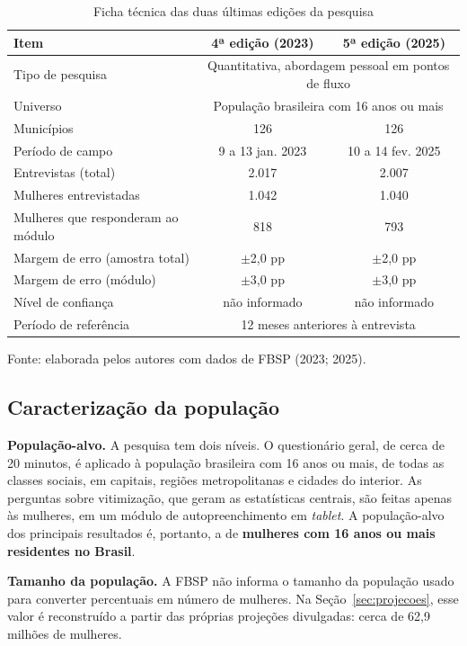 \documentclass[12pt,a4paper]{article}
\newcommand{\fonte}[1]{%
  \vspace{-2mm}
  \begin{center}\footnotesize Fonte: #1\end{center}
}
\newcommand{\fontedados}{elaborada pelos autores com dados de FBSP (2023; 2025).}
\begin{document}
\begin{table}[H]
\centering
\caption{Ficha técnica das duas últimas edições da pesquisa}
\label{tab:ficha}
\small
\begin{tabular}{lcc}
\toprule
\textbf{Item} & \textbf{4ª edição (2023)} & \textbf{5ª edição (2025)} \\
\midrule
Tipo de pesquisa & \multicolumn{2}{c}{Quantitativa, abordagem pessoal em pontos de fluxo} \\
Universo & \multicolumn{2}{c}{População brasileira com 16 anos ou mais} \\
Municípios & 126 & 126 \\
Período de campo & 9 a 13 jan. 2023 & 10 a 14 fev. 2025 \\
Entrevistas (total) & 2.017 & 2.007 \\
Mulheres entrevistadas & 1.042 & 1.040 \\
Mulheres que responderam ao módulo & 818 & 793 \\
Margem de erro (amostra total) & $\pm$2,0 pp & $\pm$2,0 pp \\
Margem de erro (módulo) & $\pm$3,0 pp & $\pm$3,0 pp \\
Nível de confiança & não informado & não informado \\
Período de referência & \multicolumn{2}{c}{12 meses anteriores à entrevista} \\
\bottomrule
\end{tabular}
\fonte{\fontedados}
\end{table}

\subsection{Caracterização da população}

\textbf{População-alvo.} A pesquisa tem dois níveis. O questionário geral, de cerca de 20 minutos, é aplicado à população brasileira com 16 anos ou mais, de todas as classes sociais, em capitais, regiões metropolitanas e cidades do interior. As perguntas sobre vitimização, que geram as estatísticas centrais, são feitas apenas às mulheres, em um módulo de autopreenchimento em \textit{tablet}. A população-alvo dos principais resultados é, portanto, a de \textbf{mulheres com 16 anos ou mais residentes no Brasil}.

\textbf{Tamanho da população.} A FBSP não informa o tamanho da população usado para converter percentuais em número de mulheres. Na Seção~\ref{sec:projecoes}, esse valor é reconstruído a partir das próprias projeções divulgadas: cerca de 62,9 milhões de mulheres.
\end{document}

